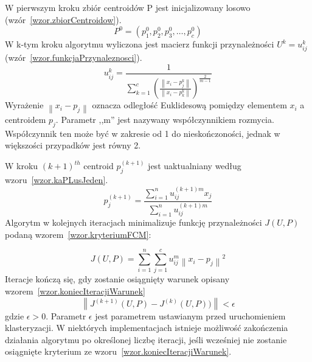 \documentclass[a4paper,twoside,12pt]{book}
\begin{document}
    W pierwszym kroku zbiór centroidów P jest inicjalizowany losowo (wzór~\ref{wzor.zbiorCentroidow}).
    \large
    \begin{equation}
        P^{0}=(p_{1}^{0}, p_{2}^{0}, p_{3}^{0}, \ldots, p_{c}^{0})
        \label{wzor.zbiorCentroidow}
    \end{equation}
    \normalsize
    W k-tym kroku algorytmu wyliczona jest macierz funkcji przynależności $U^{k} = {u_{ij}^{k}}$ (wzór~\ref{wzor.funkcjaPrzynaleznosci}).
    \large
    \begin{equation}
        u_{ij}^{k} = \frac{1}{\sum_{k=1}^{c}\left ( \frac{\left \| x_{i} - p_{j}^{k} \right \|}{\left \|x_{i} - p_{k}^{k}  \right \|} \right )^{\frac{2}{m-1}}}
        \label{wzor.funkcjaPrzynaleznosci}
    \end{equation}
    \normalsize
    Wyrażenie $\left \| x_{i} - p_{j} \right \|$ oznacza odległość Euklidesową pomiędzy elementem $x_{i}$ a
    centroidem $p_{j}$. Parametr ,,m'' jest nazywany współczynnikiem rozmycia. Współczynnik ten może być w zakresie
    od 1 do nieskończoności, jednak w większości przypadków jest równy 2.

    W kroku $(k+1)^{th}$ centroid $p_{j}^{(k+1)}$ jest uaktualniany według wzoru~\ref{wzor.kaPLusJeden}.
    \large
    \begin{equation}
        p_{j}^{(k+1)}=\frac{\sum_{i=1}^{n}u_{ij}^{(k+1)m}x_{j}}{\sum_{i=1}^{n}u_{ij}^{(k+1)m}}
        \label{wzor.kaPLusJeden}
    \end{equation}
    \normalsize
    Algorytm w kolejnych iteracjach minimalizuje funkcję przynależności $J(U,P)$ podaną wzorem~\ref{wzor.kryteriumFCM}:

    \large
    \begin{equation}
        J(U,P)= \sum_{i=1}^{n}\sum_{j=1}^{c}u_{ij}^{m}\left \| x_{i}-p_{j} \right \|^{2}
        \label{wzor.kryteriumFCM}
    \end{equation}
    \normalsize
    Iteracje kończą się, gdy zostanie osiągnięty warunek opisany wzorem~\ref{wzor.koniecIteracjiWarunek}
    \large
    \begin{equation}
        \left \| J^{(k+1)}(U,P) - J^{(k)}(U,P)) \right \| < \epsilon
        \label{wzor.koniecIteracjiWarunek}
    \end{equation}
    \normalsize
    gdzie $\epsilon > 0$. Parametr $\epsilon$ jest parametrem ustawianym przed uruchomieniem klasteryzacji.
    W niektórych implementacjach istnieje możliwość zakończenia działania algorytmu po określonej liczbę iteracji,
    jeśli wcześniej nie zostanie osiągnięte kryterium ze wzoru~\ref{wzor.koniecIteracjiWarunek}.
\end{document}

